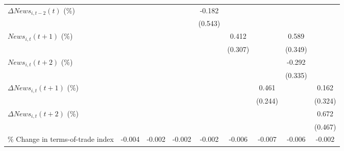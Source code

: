{\begin{tabular}{l*{8}{c}}
\addlinespace
$ \Delta News_{i,t-2}(t)$ (\%)&                     &                     &                     &      -0.182         &                     &                     &                     &                     \\
                    &                     &                     &                     &     (0.543)         &                     &                     &                     &                     \\
\addlinespace
$ News_{i,t}(t+1)$ (\%)&                     &                     &                     &                     &       0.412         &                     &       0.589         &                     \\
                    &                     &                     &                     &                     &     (0.307)         &                     &     (0.349)         &                     \\
\addlinespace
$ News_{i,t}(t+2)$ (\%)&                     &                     &                     &                     &                     &                     &      -0.292         &                     \\
                    &                     &                     &                     &                     &                     &                     &     (0.335)         &                     \\
\addlinespace
$ \Delta News_{i,t}(t+1)$ (\%)&                     &                     &                     &                     &                     &       0.461\sym{*}  &                     &       0.162         \\
                    &                     &                     &                     &                     &                     &     (0.244)         &                     &     (0.324)         \\
\addlinespace
$ \Delta News_{i,t}(t+2)$ (\%)&                     &                     &                     &                     &                     &                     &                     &       0.672         \\
                    &                     &                     &                     &                     &                     &                     &                     &     (0.467)         \\
\addlinespace
\% Change in terms-of-trade index&      -0.004         &      -0.002         &      -0.002         &      -0.002         &      -0.006         &      -0.007         &      -0.006         &      -0.002         \\

\end{tabular}}
